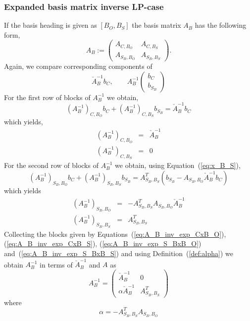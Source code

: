 \documentclass[a4paper]{article}
\begin{document}
\subsubsection{Expanded basis matrix inverse LP-case}
If the basis heading is given as $\left[B_{O}, B_{S} \right]$ the
basis matrix $A_{B}$ has the following form,
\begin{equation}
A_{B}:=
\left(\begin{array}{c|c}
        A_{C, B_{O}} & A_{C, B_{S}} \\
	\hline
	A_{S_{B}, B_{O}} & A_{S_{B}, B_{S}}
       \end{array}
\right).
\end{equation}
Again, we compare corresponding components of
\begin{equation}
\check{A}_{B}^{-1}b_{C}, \quad \quad
A_{B}^{-1}
\left(\begin{array}{c}
        b_{C} \\
	\hline
	b_{S_{B}}
       \end{array}
\right) 
\end{equation}
For the first row of blocks of $A_{B}^{-1}$ we obtain,
\begin{equation*}
\left(A_{B}^{-1}\right)_{C, B_{O}}b_{C}
  + \left(A_{B}^{-1}\right)_{C, B_{S}}b_{S_{B}} = \check{A}_{B}^{-1}b_{C}
\end{equation*}
which yields,
\begin{eqnarray}
\label{eq:A_B_inv_exp_CxB_O}
\left(A_{B}^{-1}\right)_{C, B_{O}} &=&\check{A}_{B}^{-1} \\
\label{eq:A_B_inv_exp_CxB_S}
\left(A_{B}^{-1}\right)_{C, B_{S}} &=& 0
\end{eqnarray}
For the second row of blocks of $A_{B}^{-1}$ we obtain,
using Equation~(\ref{eq:x_B_S}),
\begin{equation*}
\left(A_{B}^{-1}\right)_{S_{B}, B_{O}} b_{C}
  + \left(A_{B}^{-1}\right)_{S_{B}, B_{S}} b_{S_{B}}
=
A_{S_{B}, B_{S}}^{T}\left(b_{S_{B}} - A_{S_{B}, B_{O}}
  \check{A}_{B}^{-1} b_{C} \right)
\end{equation*}
which yields
\begin{eqnarray}
\label{eq:A_B_inv_exp_S_BxB_O}
\left(A_{B}^{-1}\right)_{S_{B}, B_{O}}
&=&
-A_{S_{B}, B_{S}}^{T}A_{S_{B}, B_{O}}\check{A}_{B}^{-1} \\
\label{eq:A_B_inv_exp_S_BxB_S}
\left(A_{B}^{-1}\right)_{S_{B}, B_{S}}
&=&
A_{S_{B}, B_{S}}^{T}
\end{eqnarray}
Collecting the blocks given by Equations~(\ref{eq:A_B_inv_exp_CxB_O}),
(\ref{eq:A_B_inv_exp_CxB_S}), (\ref{eq:A_B_inv_exp_S_BxB_O})
and~(\ref{eq:A_B_inv_exp_S_BxB_S}) and using
Definition~(\ref{def:alpha}) we obtain $A_{B}^{-1}$ in terms of
$\check{A}_{B}^{-1}$ and $A$ as
\begin{equation}
\label{eq:A_B_inv_exp}
A_{B}^{-1}=
\left(\begin{array}{c|c}
        \check{A}_{B}^{-1} & 0 \\
	\hline
	\alpha\check{A}_{B}^{-1} & A_{S_{B}, B_{S}}^{T}
      \end{array}
\right)
\end{equation}
where
\begin{equation*}
\alpha = -A_{S_{B}, B_{S}}^{T}A_{S_{B}, B_{O}}
\end{equation*}
\end{document}
